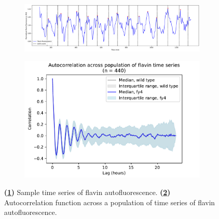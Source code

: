 

\begin{figure}
  \centering
  \begin{subfigure}[t]{0.6\textwidth}
  \centering
    \includegraphics[width=\linewidth]{26643_ts.png}
    \caption{
    }
    \label{fig:acf-sinusoid-biol-ts}
  \end{subfigure}%
  \begin{subfigure}[t]{0.4\textwidth}
  \centering
    \includegraphics[width=\linewidth]{fy4_26643_plots_06.png}
    \caption{
    }
    \label{fig:acf-sinusoid-biol-acf}
  \end{subfigure}

  \caption{
    \textbf{(\ref{fig:acf-sinusoid-biol-ts})}
    Sample time series of flavin autofluorescence.
    \textbf{(\ref{fig:acf-sinusoid-biol-acf})}
    Autocorrelation function across a population of time series of flavin autofluorescence.
  }
  \label{fig:acf-sinusoid-biol}
\end{figure}

